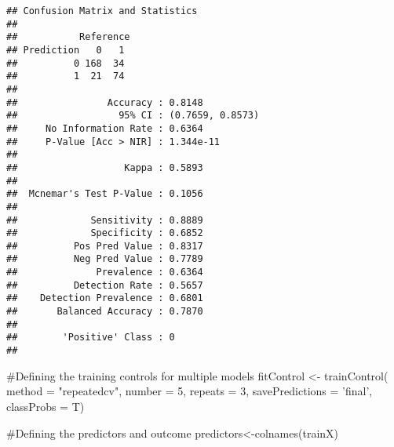 \documentclass[
]{article}
\newenvironment{Shaded}{\begin{snugshade}}{\end{snugshade}}
\newcommand{\CommentTok}[1]{\textcolor[rgb]{0.50,0.62,0.50}{#1}}
\newcommand{\DataTypeTok}[1]{\textcolor[rgb]{0.87,0.87,0.75}{#1}}
\newcommand{\DecValTok}[1]{\textcolor[rgb]{0.86,0.86,0.80}{#1}}
\newcommand{\KeywordTok}[1]{\textcolor[rgb]{0.94,0.87,0.69}{#1}}
\newcommand{\NormalTok}[1]{\textcolor[rgb]{0.80,0.80,0.80}{#1}}
\newcommand{\StringTok}[1]{\textcolor[rgb]{0.80,0.58,0.58}{#1}}
\begin{document}
\begin{verbatim}
## Confusion Matrix and Statistics
## 
##           Reference
## Prediction   0   1
##          0 168  34
##          1  21  74
##                                           
##                Accuracy : 0.8148          
##                  95% CI : (0.7659, 0.8573)
##     No Information Rate : 0.6364          
##     P-Value [Acc > NIR] : 1.344e-11       
##                                           
##                   Kappa : 0.5893          
##                                           
##  Mcnemar's Test P-Value : 0.1056          
##                                           
##             Sensitivity : 0.8889          
##             Specificity : 0.6852          
##          Pos Pred Value : 0.8317          
##          Neg Pred Value : 0.7789          
##              Prevalence : 0.6364          
##          Detection Rate : 0.5657          
##    Detection Prevalence : 0.6801          
##       Balanced Accuracy : 0.7870          
##                                           
##        'Positive' Class : 0               
## 
\end{verbatim}

\begin{Shaded}
\begin{Highlighting}[]
\CommentTok{#Defining the training controls for multiple models}
\NormalTok{fitControl <-}\StringTok{ }\KeywordTok{trainControl}\NormalTok{(}
  \DataTypeTok{method =} \StringTok{"repeatedcv"}\NormalTok{,}
  \DataTypeTok{number =} \DecValTok{5}\NormalTok{,}
  \DataTypeTok{repeats =} \DecValTok{3}\NormalTok{,}
\DataTypeTok{savePredictions =} \StringTok{'final'}\NormalTok{,}
\DataTypeTok{classProbs =}\NormalTok{ T)}

\CommentTok{#Defining the predictors and outcome}
\NormalTok{predictors<-}\KeywordTok{colnames}\NormalTok{(trainX)}
\end{Highlighting}
\end{Shaded}

\begin{Shaded}
\end{Shaded}
\end{document}
